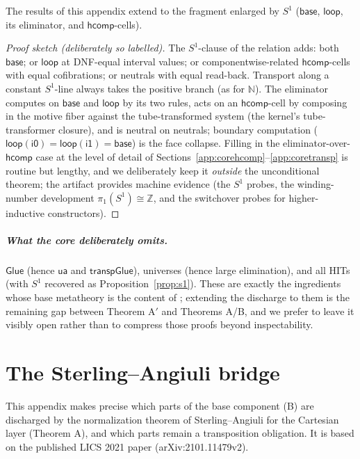 \documentclass{lmcs}
\newcommand{\hcomp}{\mathsf{hcomp}}
\newcommand{\ua}{\mathsf{ua}}
\newcommand{\Glue}{\mathsf{Glue}}
\newcommand{\ii}{\mathsf{i1}}
\newcommand{\io}{\mathsf{i0}}
\begin{document}
\begin{prop}\label{prop:s1}
  The results of this appendix extend to the fragment enlarged by
  $S^1$ ($\mathsf{base}$, $\mathsf{loop}$, its eliminator, and
  $\hcomp$-cells).
\end{prop}
\begin{proof}[Proof sketch (deliberately so labelled)]
  The $S^1$-clause of the relation adds: both $\mathsf{base}$;
  or $\mathsf{loop}$ at DNF-equal interval values; or
  componentwise-related $\hcomp$-cells with equal cofibrations; or
  neutrals with equal read-back.  Transport along a constant
  $S^1$-line always takes the positive branch (as for
  $\mathbb{N}$).  The eliminator computes on $\mathsf{base}$ and
  $\mathsf{loop}$ by its two rules, acts on an $\hcomp$-cell by
  composing in the motive fiber against the tube-transformed
  system (the kernel's tube-transformer closure), and is neutral
  on neutrals; boundary computation
  ($\mathsf{loop}(\io) = \mathsf{loop}(\ii) = \mathsf{base}$) is
  the face collapse.  Filling in the eliminator-over-$\hcomp$ case
  at the level of detail of
  Sections~\ref{app:corehcomp}--\ref{app:coretransp} is routine
  but lengthy, and we deliberately keep it \emph{outside} the
  unconditional theorem; the artifact provides machine evidence
  (the $S^1$ probes, the winding-number development
  $\pi_1(S^1) \cong \mathbb{Z}$, and the switchover probes for
  higher-inductive constructors).
\end{proof}

\subparagraph*{What the core deliberately omits.}  $\Glue$ (hence
$\ua$ and $\mathsf{transpGlue}$), universes (hence large
elimination), and all HITs (with $S^1$ recovered as
Proposition~\ref{prop:s1}).  These are exactly the ingredients
whose base metatheory is the content of
\cite{HuberNorm,SterlingAngiuli}; extending the discharge to them
is the remaining gap between Theorem A$'$ and Theorems A/B, and we
prefer to leave it visibly open rather than to compress those
proofs beyond inspectability.

\section{The Sterling--Angiuli bridge}
\label{app:bridge}

This appendix makes precise which parts of the base component (B) are
discharged by the normalization theorem of Sterling--Angiuli
\cite{SterlingAngiuli} for the Cartesian layer (Theorem A), and which
parts remain a transposition obligation.  It is based on the
published LICS 2021 paper (arXiv:2101.11479v2).
\end{document}
